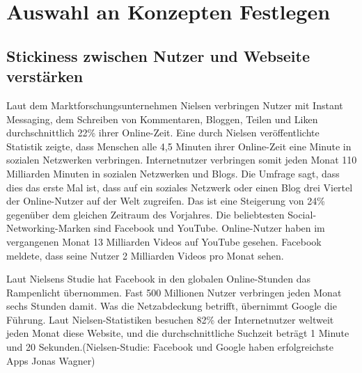 
\chapter{Auswahl an Konzepten Festlegen}
\label{auswahl-konzepte}


\section{Stickiness zwischen Nutzer und Webseite verstärken}


Laut dem Marktforschungsunternehmen Nielsen verbringen Nutzer mit Instant Messaging, dem Schreiben von Kommentaren, Bloggen, Teilen und \glqq{}Liken\grqq{} durchschnittlich 22\% ihrer Online-Zeit. Eine durch Nielsen veröffentlichte Statistik zeigte, dass Menschen alle 4,5 Minuten ihrer Online-Zeit eine Minute in sozialen Netzwerken verbringen. Internetnutzer verbringen somit jeden Monat 110 Milliarden Minuten in sozialen Netzwerken und Blogs. Die Umfrage sagt, dass dies das erste Mal ist, dass auf ein soziales Netzwerk oder einen Blog \glqq{}drei Viertel der Online-Nutzer auf der Welt zugreifen.\grqq{} Das ist eine Steigerung von 24\% gegenüber dem gleichen Zeitraum des Vorjahres. Die beliebtesten Social-Networking-Marken sind Facebook und YouTube. Online-Nutzer haben im vergangenen Monat 13 Milliarden Videos auf YouTube gesehen. Facebook meldete, dass seine Nutzer 2 Milliarden Videos pro Monat sehen.


Laut Nielsens Studie hat Facebook in den globalen Online-Stunden das Rampenlicht übernommen. Fast 500 Millionen Nutzer verbringen jeden Monat sechs Stunden damit.
Was die Netzabdeckung betrifft, übernimmt Google die Führung. Laut Nielsen-Statistiken besuchen 82\% der Internetnutzer weltweit jeden Monat diese Website, und die durchschnittliche Suchzeit beträgt 1 Minute und 20 Sekunden.(Nielsen-Studie: Facebook und Google haben erfolgreichste Apps Jonas Wagner)

